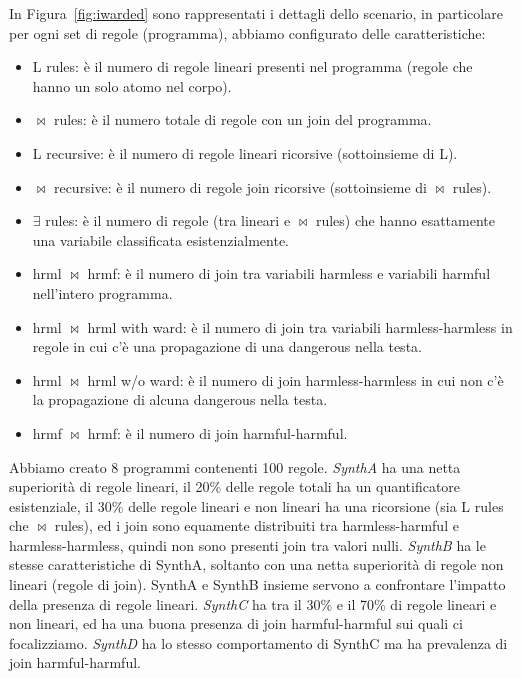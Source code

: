 In Figura~\ref{fig:iwarded} sono rappresentati i dettagli dello scenario, in particolare per ogni set di regole (programma), abbiamo configurato delle caratteristiche:
\begin{itemize}
	\item L rules: è il numero di regole lineari presenti nel programma (regole che hanno un solo atomo nel corpo).
	\item $\bowtie$ rules: è il numero totale di regole con un join del programma.
	\item L recursive: è il numero di regole lineari ricorsive (sottoinsieme di L).
	\item $\bowtie$ recursive: è il numero di regole join ricorsive (sottoinsieme di $\bowtie$ rules).
	\item $\exists$ rules: è il numero di regole (tra lineari e $\bowtie$ rules) che hanno esattamente una variabile classificata esistenzialmente.
	\item hrml $\bowtie$ hrmf: è il numero di join tra variabili harmless e variabili harmful nell'intero programma.
	\item hrml $\bowtie$ hrml with ward: è il numero di join tra variabili harmless-harmless in regole in cui c'è una propagazione di una dangerous nella testa.
	\item hrml $\bowtie$ hrml w/o ward: è il numero di join harmless-harmless in cui non c'è la propagazione di alcuna dangerous nella testa.
	\item hrmf $\bowtie$ hrmf: è il numero di join harmful-harmful.
\end{itemize}
Abbiamo creato 8 programmi contenenti 100 regole. \newline
\emph{SynthA} ha una netta superiorità di regole lineari, il 20\% delle regole totali ha un quantificatore esistenziale, il 30\% delle regole lineari e non lineari ha una ricorsione (sia L rules che $\bowtie$ rules), ed i join sono equamente distribuiti tra harmless-harmful e harmless-harmless, quindi non sono presenti join tra valori nulli. \newline
\emph{SynthB} ha le stesse caratteristiche di SynthA, soltanto con una netta superiorità di regole non lineari (regole di join). SynthA e SynthB insieme servono a confrontare l'impatto della presenza di regole lineari. \newline
\emph{SynthC} ha tra il 30\% e il 70\% di regole lineari e non lineari, ed ha una buona presenza di join harmful-harmful sui quali ci focalizziamo. \emph{SynthD} ha lo stesso comportamento di SynthC ma ha prevalenza di join harmful-harmful. \newline
